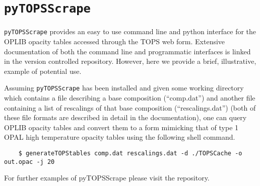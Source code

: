 \section{\texttt{pyTOPSScrape}}\label{apx:pytopsscrape}
\texttt{pyTOPSScrape} provides an easy to use command line and python interface
for the OPLIB opacity tables accessed through the TOPS web form. Extensive
documentation of both the command line and programmatic interfaces is linked
in the version controlled repository. However, here we provide a brief,
illustrative, example of potential use.

Assuming \texttt{pyTOPSScrape} has been installed and given some working
directory which contains a file describing a base composition (``comp.dat'')
and another file containing a list of rescalings of that base composition
(``rescalings.dat'') (both of these file formats are described in detail in the
documentation), one can query OPLIB opacity tables and convert them to a form
mimicking that of type 1 OPAL high temperature opacity tables using the
following shell command.

{\small
\begin{verbatim}
	$ generateTOPStables comp.dat rescalings.dat -d ./TOPSCache -o out.opac -j 20
\end{verbatim}
}

\noindent For further examples of pyTOPSScrape please visit the repository.
